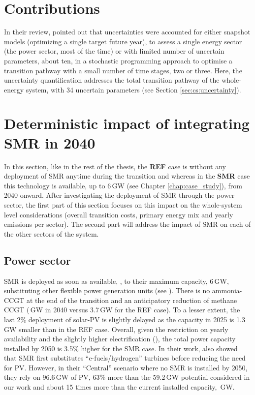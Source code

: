 \section*{Contributions}
\label{sec:atom_mol:contributions}

In their review, \citet{yue2018review} pointed out that uncertainties were accounted for either snapshot models (\ie optimizing a single target future year), to assess a single energy sector (\ie the power sector, most of the time) or with limited number of uncertain parameters, \ie about ten, in a stochastic programming approach to optimise a transition pathway with a small number of time stages, \ie two or three. Here, the uncertainty quantification addresses the total transition pathway of the whole-energy system, with 34 uncertain parameters (see Section \ref{sec:cs:uncertainty}). 



\section[Deterministic impact of integrating SMR in 2040]{Deterministic impact of integrating \gls{SMR} in 2040}
\label{sec:atom_mol:results_deter} 
In this section, like in the rest of the thesis, the \textbf{REF} case is without any deployment of \gls{SMR} anytime during the transition and whereas in the \textbf{SMR} case this technology is available, up to 6\,GW (see Chapter \ref{chap:case_study}), from 2040 onward. After investigating the deployment of \gls{SMR} through the power sector, the first part of this section focuses on this impact on the whole-system level considerations (\ie overall transition costs, primary energy mix and yearly emissions per sector). The second part will address the impact of \gls{SMR} on each of the other sectors of the system.

\subsection{Power sector}
\label{subsec:atom_mol:results_deter_power_sector}
\gls{SMR} is deployed as soon as available, , to their maximum capacity, 6\,GW, substituting other flexible power generation units (see ). There is no ammonia-\gls{CCGT} at the end of the transition and an anticipatory reduction of methane \gls{CCGT} (\,GW in 2040 versus 3.7\,GW for the REF case). To a lesser extent, the last 2\% deployment of solar-\gls{PV} is slightly delayed as the capacity in 2025 is 1.3\,GW smaller than in the REF case. Overall, given the restriction on yearly availability and the slightly higher electrification (), the total power capacity installed by 2050 is 3.5\% higher for the SMR case. In their work, \citet{PATHS2050} also showed that \gls{SMR} first substitutes ``e-fuels/hydrogen'' turbines before reducing the need for \gls{PV}. However, in their ``Central'' scenario where no \gls{SMR} is installed by 2050, they rely on 96.6\,GW of \gls{PV}, 63\% more than the 59.2\,GW potential considered in our work and about 15 times more than the current installed capacity, \,GW. \\

